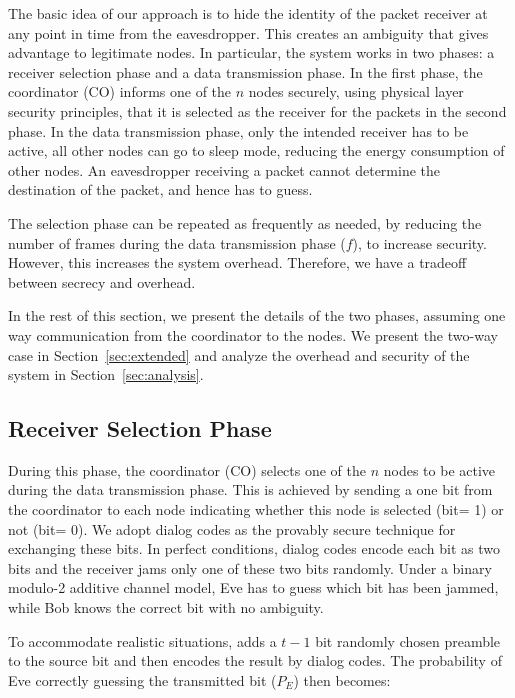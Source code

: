 \documentclass[10pt,letterpaper,conference]{IEEEtran}
\begin{document}
The basic idea of our approach is to hide the identity of the packet receiver at
any point in time from the eavesdropper. This creates an ambiguity that gives
advantage to legitimate nodes. In particular, the system works in two phases: a
receiver selection phase and a data transmission phase. In the first phase, the
coordinator (CO) informs one of the $n$ nodes securely, using physical layer security
principles, that it is selected as the receiver for the packets in the second
phase. In the data transmission phase, only the intended receiver has to be
active, all other nodes can go to sleep mode, reducing the energy consumption of
other nodes. An eavesdropper receiving a packet cannot determine the destination
of the packet, and hence has to guess.

The selection phase can be repeated as frequently as needed, by reducing the
number of frames during the data transmission phase ($f$), to increase security.
However, this increases the system overhead. Therefore, we have a tradeoff
between secrecy and overhead.

In the rest of this section, we present the details of the two phases, assuming
one way communication from the coordinator to the nodes. We present the
two-way case in Section~\ref{sec:extended} and analyze the overhead and security of
the system in Section~\ref{sec:analysis}.

\subsection{Receiver Selection Phase}

During this phase, the coordinator (CO) selects one of the $n$ nodes to be active during the data transmission phase. This is achieved by sending a one bit from the coordinator to each node indicating whether this node is selected (bit= 1) or not (bit= 0). We adopt dialog codes \cite{Arora2009} as the provably secure technique for exchanging these bits. In perfect conditions, dialog codes encode each bit as two bits and the receiver jams only one of these two bits randomly. Under a binary modulo-2 additive channel model, Eve has to guess which bit has been jammed, while Bob knows the correct bit with no ambiguity.

To accommodate realistic situations, \cite{Arora2009} adds a $t-1$ bit randomly
chosen preamble to the source bit and then encodes the result by dialog codes. The probability of Eve correctly guessing the transmitted bit ($P_E$) then becomes:
\end{document}
